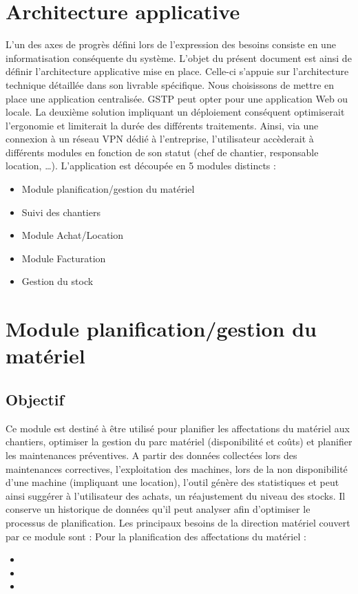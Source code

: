 \section{Architecture applicative}
        L’un des axes de progrès défini lors de l’expression des besoins consiste en une informatisation conséquente du système. L’objet du présent document est ainsi de définir l’architecture applicative mise en place. Celle-ci s’appuie sur l’architecture technique détaillée dans son livrable spécifique.
Nous choisissons de mettre en place une application centralisée. GSTP peut opter pour une application Web ou locale. La deuxième solution impliquant un déploiement conséquent optimiserait l’ergonomie et limiterait la durée des différents traitements. Ainsi, via une connexion à un réseau VPN dédié à l’entreprise, l’utilisateur accèderait à différents modules en fonction de son statut (chef de chantier, responsable location, …).
L’application est découpée en 5 modules distincts :
\begin{itemize}
	\item Module planification/gestion du matériel
	\item Suivi des chantiers
	\item Module Achat/Location
	\item Module Facturation
	\item Gestion du stock
\end{itemize}

\section{Module planification/gestion du matériel}
	\subsection{Objectif}
	Ce module est destiné à être utilisé pour planifier les affectations du matériel aux chantiers, optimiser la gestion du parc matériel (disponibilité et coûts) et planifier les maintenances préventives.
	A partir des données collectées lors des maintenances correctives, l'exploitation des machines, lors de la non disponibilité d'une machine (impliquant une location), l'outil génère des statistiques et peut ainsi suggérer à l'utilisateur des achats, un réajustement du niveau des stocks.
	Il conserve un historique de données qu'il peut analyser afin d'optimiser le processus de planification. Les principaux besoins de la direction matériel couvert par ce module sont :
        Pour la planification des affectations du matériel :
               \begin{itemize}
	               \item 
	               \item 
	               \item 
               \end{itemize}

